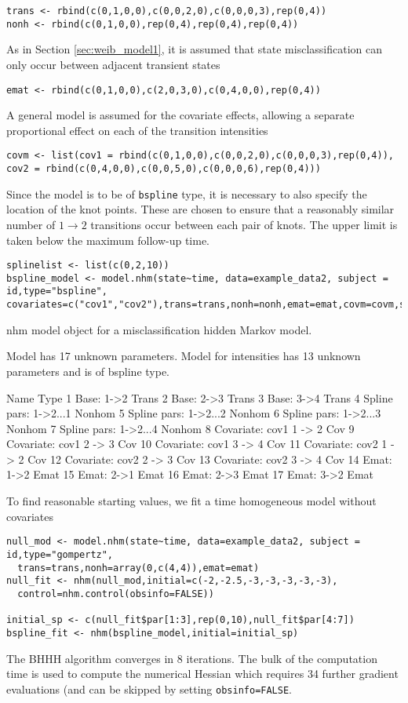 \documentclass{article}
\numberwithin{equation}{section}
\begin{document}
\begin{verbatim}
trans <- rbind(c(0,1,0,0),c(0,0,2,0),c(0,0,0,3),rep(0,4))
nonh <- rbind(c(0,1,0,0),rep(0,4),rep(0,4),rep(0,4))
\end{verbatim}
As in Section \ref{sec:weib_model1}, it is assumed that state misclassification can only occur between adjacent transient states
\begin{verbatim}
emat <- rbind(c(0,1,0,0),c(2,0,3,0),c(0,4,0,0),rep(0,4))
\end{verbatim}
A general model is assumed for the covariate effects, allowing a separate proportional effect on each of the transition intensities
\begin{verbatim}
covm <- list(cov1 = rbind(c(0,1,0,0),c(0,0,2,0),c(0,0,0,3),rep(0,4)),
cov2 = rbind(c(0,4,0,0),c(0,0,5,0),c(0,0,0,6),rep(0,4)))
\end{verbatim}
Since the model is to be of \verb!bspline! type, it is necessary to also specify the location of the knot points. These are chosen to ensure that a reasonably similar number of $1 \rightarrow 2$ transitions occur between each pair of knots. The upper limit is taken below the maximum follow-up time.
\begin{verbatim}
splinelist <- list(c(0,2,10))
bspline_model <- model.nhm(state~time, data=example_data2, subject = id,type="bspline",
covariates=c("cov1","cov2"),trans=trans,nonh=nonh,emat=emat,covm=covm,splinelist=splinelist)
\end{verbatim}
\begin{verbout}
nhm model object for a misclassification hidden Markov model.

Model has 17 unknown parameters.
Model for intensities has 13 unknown parameters and is of bspline type.

                     Name   Type
1              Base: 1->2  Trans
2              Base: 2->3  Trans
3              Base: 3->4  Trans
4   Spline pars: 1->2...1 Nonhom
5   Spline pars: 1->2...2 Nonhom
6   Spline pars: 1->2...3 Nonhom
7   Spline pars: 1->2...4 Nonhom
8  Covariate: cov1 1 -> 2    Cov
9  Covariate: cov1 2 -> 3    Cov
10 Covariate: cov1 3 -> 4    Cov
11 Covariate: cov2 1 -> 2    Cov
12 Covariate: cov2 2 -> 3    Cov
13 Covariate: cov2 3 -> 4    Cov
14             Emat: 1->2   Emat
15             Emat: 2->1   Emat
16             Emat: 2->3   Emat
17             Emat: 3->2   Emat
\end{verbout}

To find reasonable starting values, we fit a time homogeneous model without covariates
\begin{verbatim}
null_mod <- model.nhm(state~time, data=example_data2, subject = id,type="gompertz",
  trans=trans,nonh=array(0,c(4,4)),emat=emat)
null_fit <- nhm(null_mod,initial=c(-2,-2.5,-3,-3,-3,-3,-3),
  control=nhm.control(obsinfo=FALSE))

initial_sp <- c(null_fit$par[1:3],rep(0,10),null_fit$par[4:7])
bspline_fit <- nhm(bspline_model,initial=initial_sp)
\end{verbatim}
The BHHH algorithm converges in 8 iterations. The bulk of the computation time is used to compute the numerical Hessian which requires 34 further gradient evaluations (and can be skipped by setting \verb!obsinfo=FALSE!.
\end{document}
